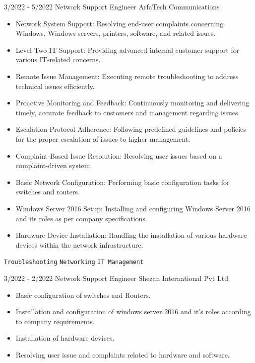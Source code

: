 \documentclass[9pt]{developercv} %
\begin{document}
\begin{entrylist}
        \entry
		{3/2022 - 5/2022}
		{Network Support Engineer}
		{ArfaTech Communications}
		{\vspace{-10pt}
        \begin{itemize}[noitemsep,topsep=0pt,parsep=0pt,partopsep=0pt, leftmargin=-1pt]
    \item Network System Support: Resolving end-user complaints concerning Windows, Windows servers, printers, software, and related issues.
    \item Level Two IT Support: Providing advanced internal customer support for various IT-related concerns.
    \item Remote Issue Management: Executing remote troubleshooting to address technical issues efficiently.
    \item Proactive Monitoring and Feedback: Continuously monitoring and delivering timely, accurate feedback to customers and management regarding issues.
    \item Escalation Protocol Adherence: Following predefined guidelines and policies for the proper escalation of issues to higher management.
    \item Complaint-Based Issue Resolution: Resolving user issues based on a complaint-driven system.
    \item Basic Network Configuration: Performing basic configuration tasks for switches and routers.
    \item Windows Server 2016 Setup: Installing and configuring Windows Server 2016 and its roles as per company specifications.
    \item Hardware Device Installation: Handling the installation of various hardware devices within the network infrastructure.
        \end{itemize}
        \texttt{Troubleshooting} \slashsep \texttt{Networking} \slashsep \texttt{IT Management}}
        \entry
		{3/2022 - 2/2022}
		{Network Support Engineer}
		{Shezan International Pvt Ltd}
		{\vspace{-10pt}
        \begin{itemize}[noitemsep,topsep=0pt,parsep=0pt,partopsep=0pt, leftmargin=-1pt]
            \item Basic configuration of switches and Routers.
            \item Installation and configuration of windows server 2016 and it’s roles according to company requirements.
            \item Installation of hardware devices.
            \item Resolving user issue and complaints related to hardware and software.

\end{itemize}}
\end{entrylist}
\end{document}
